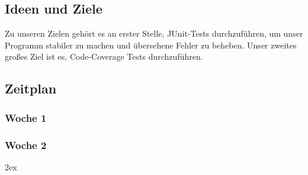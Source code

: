 \documentclass[12pt,a4paper,titlepage]{article}
\begin{document}
	\subsection{Ideen und Ziele}
Zu unseren Zielen gehört es an erster Stelle, JUnit-Tests durchzuführen, um unser Programm stabiler zu machen und übersehene Fehler zu beheben. Unser zweites großes Ziel ist es, Code-Coverage Tests durchzuführen.
	\subsection{Zeitplan}
\subsubsection{Woche 1}
	
\subsubsection{Woche 2}

\begingroup
\parindent 0pt
\parskip 2ex
\def\enotesize{\normalsize}

\endgroup
\end{document}
